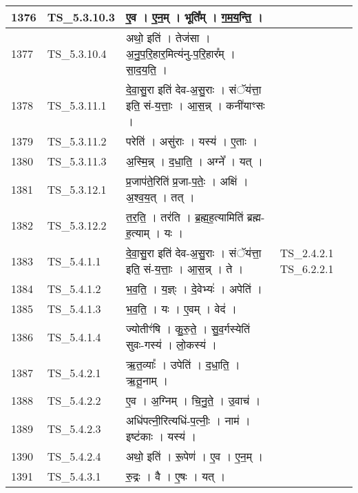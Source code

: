 \documentclass[17pt]{extarticle}
\begin{document}
\begin{longtable}{||p{0.4in}||p{0.9in}||p{4.0in}||p{0.9in}||}
        \hline
            1376 & TS\_5.3.10.3 & ए॒व   ।   ए॒न॒म्   ।   भूति᳚म्   ।   ग॒म॒य॒न्ति॒   ।    &      \\
        \hline
            1377 & TS\_5.3.10.4 & अथो॒ इति॑   ।   तेज॑सा   ।   अ॒नु॒प॒रि॒हार॒मित्य॑नु{-}प॒रि॒हार᳚म्   ।   सा॒द॒य॒ति॒   ।    &      \\
        \hline
            1378 & TS\_5.3.11.1 & दे॒वा॒सु॒रा इति॑ देव{-}अ॒सु॒राः   ।   संॅय॑त्ता॒ इति॒ सं{-}य॒त्ताः॒   ।   आ॒स॒न्न्   ।   कनी॑याꣳसः   ।    &      \\
        \hline
            1379 & TS\_5.3.11.2 & परेति॑   ।   असु॑राः   ।   यस्य॑   ।   ए॒ताः   ।    &      \\
        \hline
            1380 & TS\_5.3.11.3 & अ॒स्मि॒न्न्   ।   द॒धा॒ति॒   ।   अग्ने᳚   ।   यत्   ।    &      \\
        \hline
            1381 & TS\_5.3.12.1 & प्र॒जाप॑ते॒रिति॑ प्र॒जा{-}प॒तेः॒   ।   अक्षि॑   ।   अ॒श्व॒य॒त्   ।   तत्   ।    &      \\
        \hline
            1382 & TS\_5.3.12.2 & त॒र॒ति॒   ।   तर॑ति   ।   ब्र॒ह्म॒ह॒त्यामिति॑ ब्रह्म{-}ह॒त्याम्   ।   यः   ।    &      \\
        \hline
            1383 & TS\_5.4.1.1 & दे॒वा॒सु॒रा इति॑ देव{-}अ॒सु॒राः   ।   संॅय॑त्ता॒ इति॒ सं{-}य॒त्ताः॒   ।   आ॒स॒न्न्   ।   ते   ।    & TS\_2.4.2.1  TS\_6.2.2.1       \\
        \hline
            1384 & TS\_5.4.1.2 & भ॒व॒ति॒   ।   य॒ज्ञ्ः   ।   दे॒वेभ्यः॑   ।   अपेति॑   ।    &      \\
        \hline
            1385 & TS\_5.4.1.3 & भ॒व॒ति॒   ।   यः   ।   ए॒वम्   ।   वेद॑   ।    &      \\
        \hline
            1386 & TS\_5.4.1.4 & ज्योतीꣳ॑षि   ।   कु॒रु॒ते॒   ।   सु॒व॒र्गस्येति॑ सुवः{-}गस्य॑   ।   लो॒कस्य॑   ।    &      \\
        \hline
            1387 & TS\_5.4.2.1 & ऋ॒त॒व्याः᳚   ।   उपेति॑   ।   द॒धा॒ति॒   ।   ऋ॒तू॒नाम्   ।    &      \\
        \hline
            1388 & TS\_5.4.2.2 & ए॒व   ।   अ॒ग्निम्   ।   चि॒नु॒ते॒   ।   उ॒वाच॑   ।    &      \\
        \hline
            1389 & TS\_5.4.2.3 & अधि॑पत्नी॒रित्यधि॑{-}प॒त्नीः॒   ।   नाम॑   ।   इष्ट॑काः   ।   यस्य॑   ।    &      \\
        \hline
            1390 & TS\_5.4.2.4 & अथो॒ इति॑   ।   रू॒पेण॑   ।   ए॒व   ।   ए॒न॒म्   ।    &      \\
        \hline
            1391 & TS\_5.4.3.1 & रु॒द्रः   ।   वै   ।   ए॒षः   ।   यत्   ।    &      \\

\end{longtable}
\end{document}
